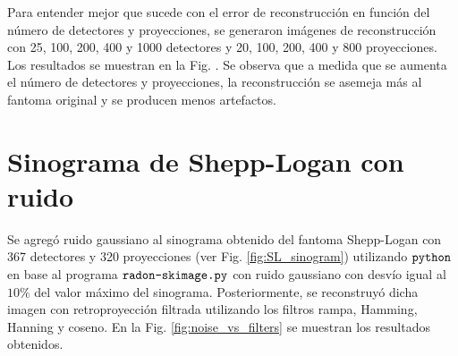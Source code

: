 \documentclass[letterpaper,12pt]{article}
\theoremstyle{plain}
\begin{document}
Para entender mejor que sucede con el error de reconstrucción en función del número de detectores y proyecciones, se generaron imágenes de reconstrucción con 25, 100, 200, 400 y 1000 detectores y 20, 100, 200, 400 y 800 proyecciones. Los resultados se muestran en la Fig. . Se observa que a medida que se aumenta el número de detectores y proyecciones, la reconstrucción se asemeja más al fantoma original y se producen menos artefactos.

\section{Sinograma de Shepp-Logan con ruido}

Se agregó ruido gaussiano al sinograma obtenido del fantoma Shepp-Logan con 367 detectores y 320 proyecciones (ver Fig. \ref{fig:SL_sinogram}) utilizando $\verb|python|$ en base al programa $\verb|radon-skimage.py|$ con ruido gaussiano con desvío igual al $10\%$ del valor máximo del sinograma. Posteriormente, se reconstruyó dicha imagen con retroproyección filtrada utilizando los filtros rampa, Hamming, Hanning y coseno. En la Fig. \ref{fig:noise_vs_filters} se muestran los resultados obtenidos. 
\end{document}
